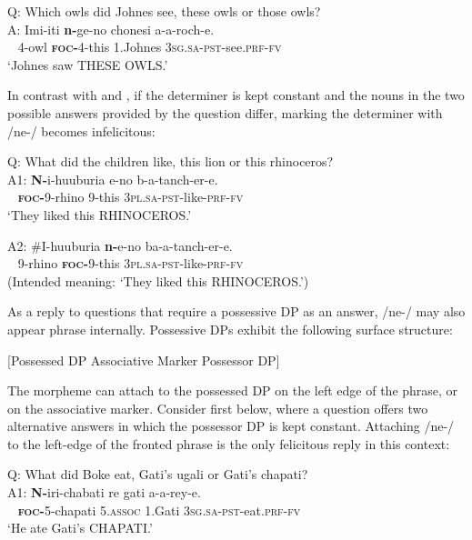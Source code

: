 \documentclass[output=paper,modfonts]{langscibook}
\begin{document}
\ea\label{ex:landmann:31}
    Q: Which owls did Johnes see, these owls or those owls?\\
\gll A: Imi-iti \textbf{n-}ge-no chonesi a-a-roch-e.\\
    ~ 4-owl \textsc{\textbf{foc-}}4-this 1.Johnes \textsc{3sg}.\textsc{sa}-\textsc{pst}-see.\textsc{prf}-\textsc{fv}\\
\glt ‘Johnes saw THESE OWLS.’
\z

In contrast with  and , if the determiner is kept constant and the nouns in the two possible answers provided by the question differ, marking the determiner with /ne-/ becomes infelicitous:

\ea\label{ex:landmann:32}
 Q: What did the children like, this lion or this rhinoceros?\\
\gll A1: \textbf{N-}i-huuburia e-no b-a-tanch-er-e.\\
    ~ \textsc{\textbf{foc-}}9-rhino 9-this \textsc{3pl}.\textsc{sa}-\textsc{pst}-like-\textsc{prf}-\textsc{fv}\\
\glt ‘They liked this RHINOCEROS.’
\z

\ea\label{ex:landmann:33}
\gll A2: \#I-huuburia \textbf{n-}e-no ba-a-tanch-er-e.\\
   ~ 9-rhino \textsc{\textbf{foc-}}9-this \textsc{3pl}.\textsc{sa}-\textsc{pst}-like-\textsc{prf}-\textsc{fv}\\
\glt (Intended meaning: ‘They liked this RHINOCEROS.’)
\z

As a reply to questions that require a possessive DP as an answer, /ne-/ may also appear phrase internally. Possessive DPs exhibit the following surface structure:

\ea\label{ex:landmann:34} 
{[Possessed DP Associative Marker Possessor DP]}\\
\z

The morpheme can attach to the possessed DP on the left edge of the phrase, or on the associative marker. Consider first  below, where a question offers two alternative answers in which the possessor DP is kept constant. Attaching /ne-/ to the left-edge of the fronted phrase is the only felicitous reply in this context:

\ea\label{ex:landmann:35}
Q: What did Boke eat, Gati’s ugali or Gati’s chapati?\\
\gll A1: \textbf{N-}iri-chabati re gati a-a-rey-e.\\
    ~ \textsc{\textbf{foc-}}5-chapati 5.\textsc{assoc} 1.Gati \textsc{3sg}.\textsc{sa}-\textsc{pst}-eat.\textsc{prf}-\textsc{fv}\\
\glt ‘He ate Gati’s CHAPATI.’
\z
\end{document}
